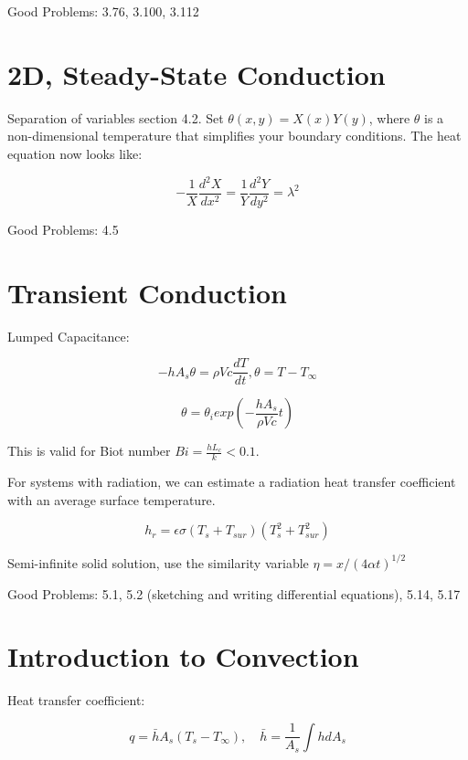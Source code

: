 \documentclass[paper=letter, fontsize=11pt]{scrartcl}
\numberwithin{equation}{section}        %
\numberwithin{figure}{section}          %
\numberwithin{table}{section}               %
\begin{document}
\bigskip Good Problems: 3.76, 3.100, 3.112


\section{2D, Steady-State Conduction}

Separation of variables section 4.2. Set $\theta(x,y) = X(x)Y(y)$, where $\theta$ is a non-dimensional temperature that simplifies your boundary conditions. The heat equation now looks like:

\begin{equation}
-\frac{1}{X}\frac{d^2X}{dx^2} = \frac{1}{Y}\frac{d^2Y}{dy^2} = \lambda^2
\end{equation}

\bigskip Good Problems: 4.5


\section{Transient Conduction}

Lumped Capacitance:

\begin{equation}
-hA_s\theta = \rho Vc\frac{dT}{dt}, \theta = T-T_\infty
\end{equation}

\begin{equation}
\theta = \theta_i exp\left(-\frac{hA_s}{\rho Vc}t\right)
\end{equation}

This is valid for Biot number $Bi = \frac{hL_c}{k} < 0.1$.

For systems with radiation, we can estimate a radiation heat transfer coefficient with an average surface temperature.

\begin{equation}
h_r = \epsilon\sigma(T_s + T_{sur})(T_s^2 + T_{sur}^2)
\end{equation}

Semi-infinite solid solution, use the similarity variable $\eta = x/(4\alpha t)^{1/2}$

\bigskip Good Problems: 5.1, 5.2 (sketching and writing differential equations), 5.14, 5.17


\section{Introduction to Convection}
Heat transfer coefficient:

\begin{equation}
q = \bar h A_s(T_s-T_\infty), \quad \bar h = \frac{1}{A_s}\int hdA_s
\end{equation}
\end{document}
